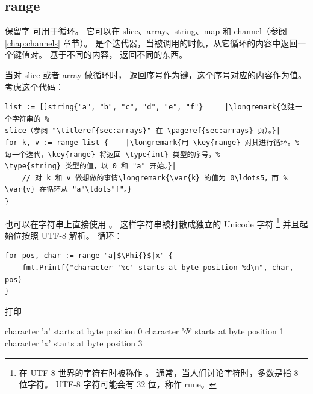 \subsection{range}
保留字  可用于循环。
它可以在 slice、array、string、map 和 channel（参阅 \ref{chap:channels} 章节）。
 是个迭代器，当被调用的时候，从它循环的内容中返回一个键值对。
基于不同的内容， 返回不同的东西。

当对 slice 或者 array 做循环时， 返回序号作为键，这个序号对应的内容作为值。
考虑这个代码：
\begin{lstlisting}
list := []string{"a", "b", "c", "d", "e", "f"}     |\longremark{创建一个字符串的 %
slice（参阅 "\titleref{sec:arrays}" 在 \pageref{sec:arrays} 页）。}|
for k, v := range list {	|\longremark{用 \key{range} 对其进行循环。%
每一个迭代，\key{range} 将返回 \type{int} 类型的序号，%
\type{string} 类型的值，以 0 和 "a" 开始。}|
    // 对 k 和 v 做想做的事情\longremark{\var{k} 的值为 0\ldots5，而 %
\var{v} 在循环从 "a"\ldots"f"。}
}
\end{lstlisting}
\showremarks

也可以在字符串上直接使用 。
这样字符串被打散成独立的 Unicode 字符
\footnote{在 UTF-8 世界的字符有时被称作 。
通常，当人们讨论字符时，多数是指 8 位字符。
UTF-8 字符可能会有 32 位，称作 rune。}
并且起始位按照 UTF-8 解析。
循环：
\begin{lstlisting}
for pos, char := range "a|$\Phi{}$|x" {
    fmt.Printf("character '%c' starts at byte position %d\n", char, pos)
}
\end{lstlisting}
打印
\begin{display}
character 'a' starts at byte position 0
character '\begin{math}\Phi\end{math}' starts at byte position 1
character 'x' starts at byte position 3 
\end{display}

